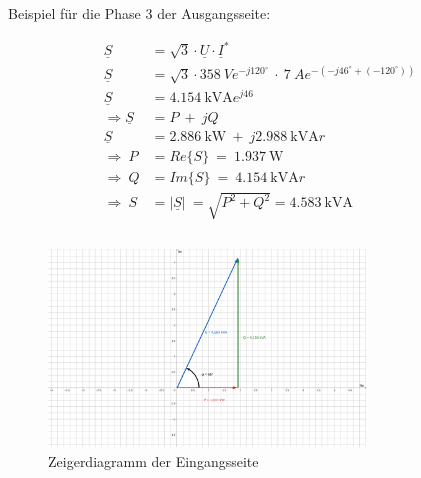 \begin{enumerate}[label=\alph*)]
	      Beispiel für die Phase 3 der Ausgangsseite:
	      \begin{center}
		      \begin{align*}
			      \underline{S}                 & = \sqrt{3}\cdot\underline{U}\cdot\underline{I}^*                                                  \\
			      \underline{S}                 & = \sqrt{3}\cdot 358\ Ve^{-j120^\circ}\ \cdot\ 7\ Ae^{-(-j46^\circ+(-120^\circ))}                  \\
			      \underline{S}                 & = \SI{4,154}{\kilo\volt\ampere}e^{j46}                                                            \\
			      \Longrightarrow \underline{S} & =  P\ +\ jQ                                                                                       \\
			      \underline{S}                 & = \SI{2,886}{\kilo\watt}\ +\ j\SI{2,988}{\kilo\volt\ampere r}                                     \\
			      \Longrightarrow\ P            & = Re{\{S\}}\                                                   =\   \SI{1,937}{\watt}             \\
			      \Longrightarrow\ Q            & = Im{\{S\}}\                                                   =\ \SI{4,154}{\kilo\volt\ampere r} \\
			      \Longrightarrow\ S            & =  \left\lvert {\underline{S}}  \right\rvert\ = \sqrt{P^2+Q^2} = \SI{4,583}{\kilo\volt\ampere}    \\               \\
		      \end{align*}
	      \end{center}

	      \begin{figure}[h!]
		      \begin{center}
			      \includegraphics[width=0.75\textwidth]{img/4.2.1.1}
		      \end{center}
		      \caption{Zeigerdiagramm der Eingangsseite}\label{img:4.2.1.1}
	      \end{figure}


\end{enumerate}
